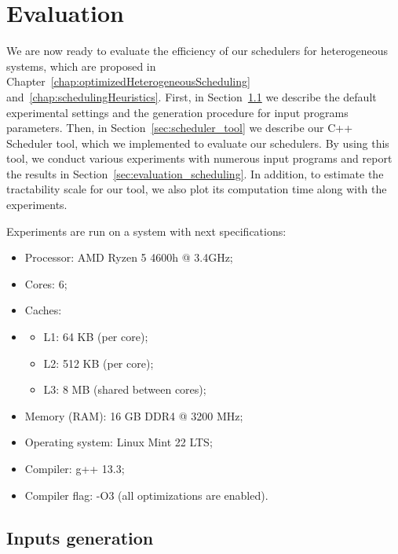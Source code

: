 \chapter{Evaluation}
\label{chap:evaluation}

We are now ready to evaluate the efficiency of our schedulers for heterogeneous systems, which are proposed in Chapter~\ref{chap:optimizedHeterogeneousScheduling} and~\ref{chap:schedulingHeuristics}. First, in Section~\ref{sec:inputs_generation} we describe the default experimental settings and the generation procedure for input programs parameters. Then, in Section~\ref{sec:scheduler_tool} we describe our C++ Scheduler tool, which we implemented to evaluate our schedulers. By using this tool, we conduct various experiments with numerous input programs and report the results in Section~\ref{sec:evaluation_scheduling}. In addition, to estimate the tractability scale for our tool, we also plot its computation time along with the experiments.


Experiments are run on a system with next specifications:
%
\begin{itemize}
\item Processor: AMD Ryzen 5 4600h @ 3.4GHz;
\item Cores: 6;
\item Caches:
\item[]
\begin{itemize}
\item L1: 64 KB (per core);
\item L2: 512 KB (per core);
\item L3: 8 MB (shared between cores);
\end{itemize}
\item Memory (RAM): 16 GB DDR4 @ 3200 MHz;
\item Operating system: Linux Mint 22 LTS;
\item Compiler: g++ 13.3;
\item Compiler flag: -O3 (all optimizations are enabled).
\end{itemize}




\section{Inputs generation}
\label{sec:inputs_generation}

